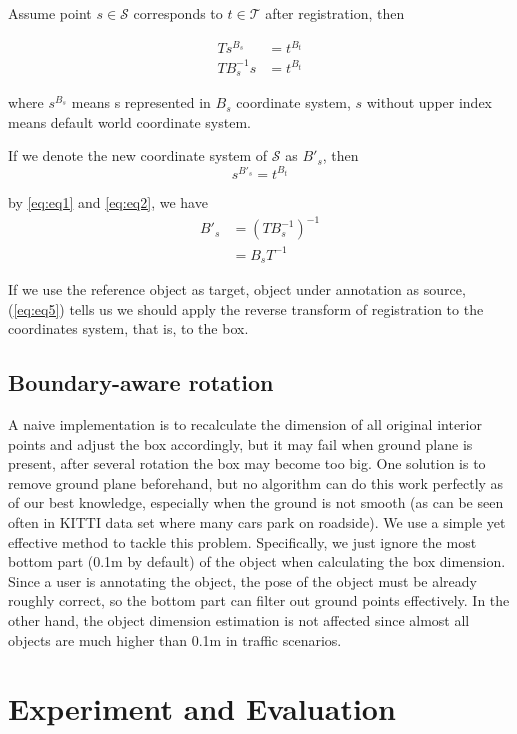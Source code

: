 \documentclass[letterpaper, 10 pt, conference]{ieeeconf}  %
\begin{document}
Assume point $s \in \mathcal{S}$ corresponds to $t \in \mathcal{T}$ after registration, then


\begin{align}
T s^{B_s} &= t^{B_t}\\
T B_s^{-1}s &= t^{B_t} \label{eq:eq1}
\end{align}

where $s^{B_s}$ means s represented in $B_s$ coordinate system, $s$ without upper index means default world coordinate system.

If we denote the new coordinate system of $\mathcal{S}$ as $B'_s$, then
\begin{equation} \label{eq:eq2}
s^{B'_s} = t^{B_t}
\end{equation}

by \ref{eq:eq1} and \ref{eq:eq2}, we have
\begin{align}
{B'_s} & = (T B_s^{-1})^{-1}\\
       & = B_s T^{-1} \label{eq:eq5}
\end{align}

If we use the reference object as target, object under annotation as source, (\ref{eq:eq5}) tells us we should apply the reverse transform of registration to the coordinates system, that is, to the box.


\subsection{Boundary-aware rotation}

A naive implementation is to recalculate the dimension of all original interior points and adjust the box accordingly, but it may fail when ground plane is present, after several rotation the box may become too big. One solution is to remove ground plane beforehand, but no algorithm can do this work perfectly as of our best knowledge, especially when the ground is not smooth (as can be seen often in KITTI data set\cite{Geiger2012CVPR} where many cars park on roadside). We use a simple yet effective method to tackle this problem. Specifically, we just ignore the most bottom part (0.1m by default) of the object when calculating the box dimension. Since a user is annotating the object, the pose of the object must be already roughly correct, so the bottom part can filter out ground points effectively. In the other hand, the object dimension estimation is not affected since almost all objects are much higher than 0.1m in traffic scenarios.


\section{Experiment and Evaluation}
\label {Metrics}
\end{document}
